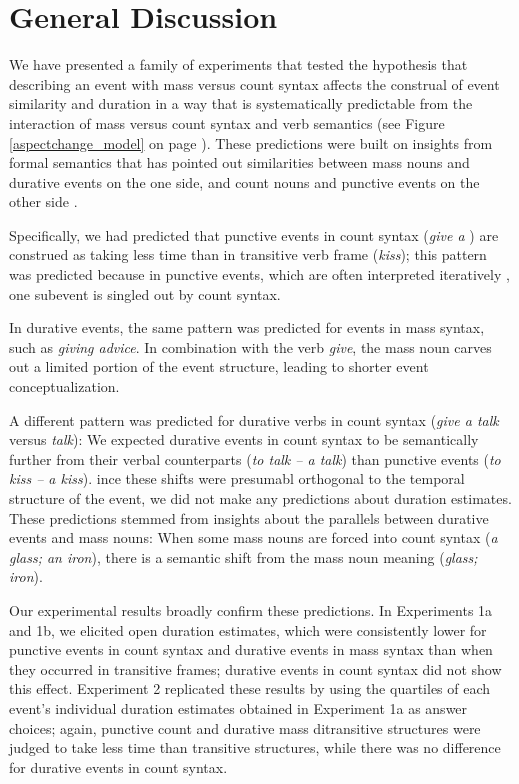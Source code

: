 \documentclass[preprint,12pt,authoryear]{elsarticle}
\begin{document}
\section{General Discussion}
We have presented a family of experiments that tested the hypothesis that describing an event with mass versus count syntax affects the construal of event similarity and duration in a way that is systematically predictable from the interaction of mass versus count syntax and verb semantics (see Figure \ref{aspectchange_model} on page \pageref{aspectchange_model}). These predictions were built on insights from formal semantics that has pointed out similarities between mass nouns and durative events on the one side, and count nouns and punctive events on the other side \citep{Krifka1992,jackendoff1991parts,Harley05howdo,WellwoodOUP,bach1986algebra,casati2008event}.

Specifically, we had predicted that punctive events in count syntax (\emph{give a }) are construed as taking less time than in transitive verb frame (\emph{kiss}); this pattern was predicted because in punctive events, which are often interpreted iteratively \citep{Kim2015}, one subevent is singled out by count syntax.

In durative events, the same pattern was predicted for events in mass syntax, such as \emph{giving advice}. In combination with the  verb \emph{give}, the mass noun carves out a limited portion of the event structure, leading to shorter event conceptualization. 

A different pattern was predicted for durative verbs in count syntax (\emph{give a talk} versus \emph{talk}): We expected durative events in count syntax to be semantically further from their verbal counterparts (\emph{to talk -- a talk}) than punctive events (\emph{to kiss -- a kiss}). ince these shifts were presumabl orthogonal to the temporal structure of the event, we did not make any predictions about duration estimates. These predictions stemmed from insights about the parallels between durative events and mass nouns: When some mass nouns are forced into count syntax (\emph{a glass; an iron}), there is a semantic shift from the mass noun meaning (\emph{glass; iron}).

Our experimental results broadly confirm these predictions. In Experiments 1a and 1b, we elicited open duration estimates, which were consistently lower for punctive events in count syntax and durative events in mass syntax than when they occurred in transitive frames; durative events in count syntax did not show this effect. Experiment 2 replicated these results by using the quartiles of each event's individual duration estimates obtained in Experiment 1a as answer choices; again, punctive count and durative mass ditransitive structures were judged to take less time than transitive structures, while there was no difference for durative events in count syntax. 
\end{document}
